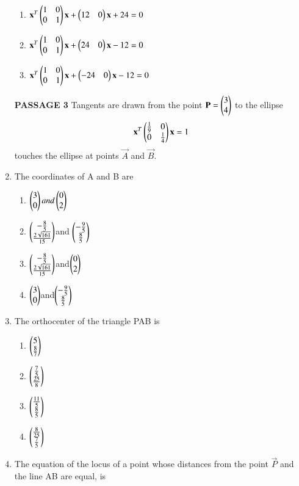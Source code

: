 \begin{enumerate}[label=\arabic*.,ref=\thesubsection.\theenumi]
\begin{enumerate}
    \item $\mathbf{x}^T\begin{pmatrix}1&0\\0&1\end{pmatrix}\mathbf{x}+\begin{pmatrix}12&0\end{pmatrix}\mathbf{x}+24=0$
    \item $\mathbf{x}^T\begin{pmatrix}1&0\\0&1\end{pmatrix}\mathbf{x}+\begin{pmatrix}24&0\end{pmatrix}\mathbf{x}-12=0$
    \item $\mathbf{x}^T\begin{pmatrix}1&0\\0&1\end{pmatrix}\mathbf{x}+\begin{pmatrix}-24&0\end{pmatrix}\mathbf{x}-12=0$
    \end{enumerate}
    \textbf{PASSAGE 3}
    Tangents are drawn from the point $\mathbf{P}=\begin{pmatrix}3\\4\end{pmatrix}$ to the ellipse
    \begin{align}
    \mathbf{x}^T\begin{pmatrix}\frac{1}{9}&0\\0&\frac{1}{4}\end{pmatrix}\mathbf{x}=1
    \end{align} touches the ellipse at points $\vec{A}$ and $\vec{B}$.
    \item The coordinates of A and B are 
    \begin{enumerate}
    \item $\begin{pmatrix}3\\0\end{pmatrix}and\begin{pmatrix}0\\2\end{pmatrix}$
    \item $\begin{pmatrix}-\frac{8}{5}\\\frac{2\sqrt{161}}{15}\end{pmatrix}$and
    $\begin{pmatrix}-\frac{9}{5} \\\frac{8}{5}\end{pmatrix}$
    \item $\begin{pmatrix}-\frac{8}{5}\\\frac{2\sqrt{161}}{15}\end{pmatrix}$and$\begin{pmatrix}0\\2\end{pmatrix}$
    \item $\begin{pmatrix}3\\0\end{pmatrix}$and$\begin{pmatrix}-\frac{9}{5}\\\frac{8}{5}\end{pmatrix}$
    \end{enumerate}
    \item The orthocenter of the triangle PAB is 
    \begin{enumerate}
    \item $\begin{pmatrix}5\\\frac{8}{7}\end{pmatrix}$
    \item $\begin{pmatrix}\frac{7}{5}\\\frac{25}{8}\end{pmatrix}$
    \item $\begin{pmatrix}\frac{11}{5}\\\frac{8}{5}\end{pmatrix}$
    \item $\begin{pmatrix}\frac{8}{25}\\\frac{7}{5}\end{pmatrix}$
    \end{enumerate}
    \item The equation of the locus of a point whose distances from the point $\vec{P}$ and the line 		AB are equal, is 

\end{enumerate}
